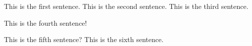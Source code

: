 This is the first
sentence. This is the second sentence. This is the
third sentence.



This is the fourth
sentence! 


This is the fifth sentence? This is the
sixth sentence.
